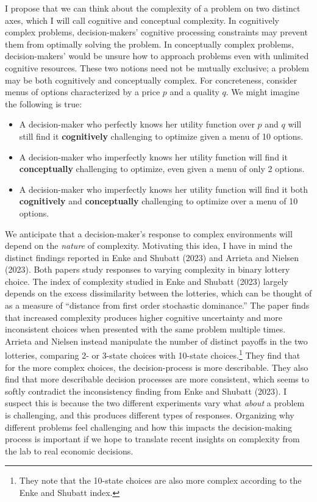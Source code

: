 \documentclass[12pt]{article}
\begin{document}
I propose that we can think about the complexity of a problem on two distinct axes, which I will call cognitive and conceptual complexity. In cognitively complex problems, decision-makers' cognitive processing constraints may prevent them from optimally solving the problem. In conceptually complex problems, decision-makers' would be unsure how to approach problems even with unlimited cognitive resources. These two notions need not be mutually exclusive; a problem may be both cognitively and conceptually complex. For concreteness, consider menus of options characterized by a price $p$ and a quality $q$. We might imagine the following is true:
\begin{itemize}
    \item A decision-maker who perfectly knows her utility function over $p$ and $q$ will still find it \textbf{cognitively} challenging to optimize given a menu of 10 options.
    \item A decision-maker who imperfectly knows her utility function will find it \textbf{conceptually} challenging to optimize, even given a menu of only 2 options.
    \item A decision-maker who imperfectly knows her utility function will find it both \textbf{cognitively} and \textbf{conceptually} challenging to optimize over a menu of 10 options.
\end{itemize}

We anticipate that a decision-maker's response to complex environments will depend on the \textit{nature} of complexity. Motivating this idea, I have in mind the distinct findings reported in Enke and Shubatt (2023) and Arrieta and Nielsen (2023). Both papers study responses to varying complexity in binary lottery choice. The index of complexity studied in Enke and Shubatt (2023) largely depends on the excess dissimilarity between the lotteries, which can be thought of as a measure of ``distance from first order stochastic dominance.'' The paper finds that increased complexity produces higher cognitive uncertainty and more inconsistent choices when presented with the same problem multiple times. Arrieta and Nielsen instead manipulate the number of distinct payoffs in the two lotteries, comparing 2- or 3-state choices with 10-state choices.\footnote{They note that the 10-state choices are also more complex according to the Enke and Shubatt index.} They find that for the more complex choices, the decision-process is more describable. They also find that more describable decision processes are more consistent, which seems to softly contradict the inconsistency finding from Enke and Shubatt (2023). I suspect this is because the two different experiments vary what \textit{about} a problem is challenging, and this produces different types of responses. Organizing why different problems feel challenging and how this impacts the decision-making process is important if we hope to translate recent insights on complexity from the lab to real economic decisions.
\end{document}
